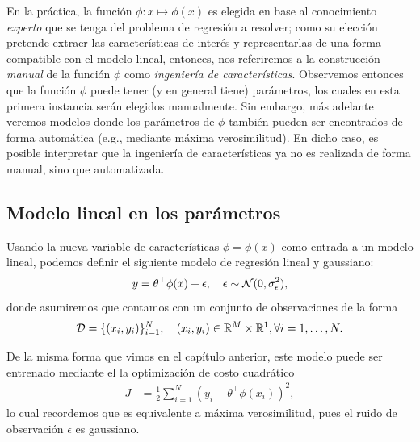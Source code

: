 En la práctica, la función $\phi:x\mapsto\phi(x)$ es elegida en base  al conocimiento \emph{experto} que se tenga del problema de regresión a resolver;  como su elección pretende extraer las características de interés y representarlas  de una forma compatible con el modelo lineal, entonces, nos referiremos a la construcción \emph{manual} de la función $\phi$ como \emph{ingeniería de características}. Observemos entonces que la función $\phi$ puede tener (y en general tiene) parámetros, los cuales en esta primera instancia serán elegidos manualmente. Sin embargo, más adelante veremos modelos donde los parámetros de $\phi$ también pueden ser encontrados de forma automática (e.g., mediante máxima verosimilitud). En dicho caso, es posible interpretar que la ingeniería de características ya no es realizada de forma manual, sino que automatizada.  



\subsection{Modelo lineal en los parámetros} 
\label{sub:modelo_lineal_param}


Usando la nueva variable de  características $\phi=\phi(x)$ como entrada a un modelo lineal, podemos definir el siguiente modelo de regresión lineal y gaussiano: 
\begin{equation}
    y = \theta^\top\phi(x) + \epsilon,\quad \epsilon\sim{\mathcal N}(0,\sigma_\epsilon^2)\label{eq:reg_no_lin},
\end{equation}
donde asumiremos que contamos con un conjunto de observaciones de la forma
\begin{equation}
    {\mathcal D} = \{(x_i,y_i)\}_{i=1}^N,\quad (x_i, y_i)\in{\mathbb R}^M\times{\mathbb R}^1,\forall i=1,\ldots,N.
    \label{eq:training_set_nl}
\end{equation}

De la misma forma que vimos en el capítulo anterior, este modelo puede ser entrenado mediante el la optimización de costo cuadrático
\begin{align}
    J &= \frac{1}{2} \sum_{i=1}^N(y_i - \theta^\top\phi(x_i))^2,
\end{align}
lo cual recordemos que es equivalente a máxima verosimilitud, pues el ruido de observación $\epsilon$ es gaussiano.

